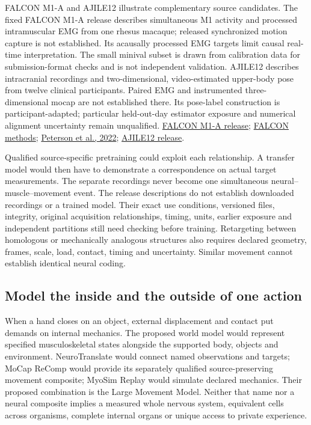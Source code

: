FALCON M1-A and AJILE12 illustrate complementary source candidates. The fixed FALCON M1-A release describes simultaneous M1 activity and processed intramuscular EMG from one rhesus macaque; released synchronized motion capture is not established. Its acausally processed EMG targets limit causal real-time interpretation. The small minival subset is drawn from calibration data for submission-format checks and is not independent validation. AJILE12 describes intracranial recordings and two-dimensional, video-estimated upper-body pose from twelve clinical participants. Paired EMG and instrumented three-dimensional mocap are not established there. Its pose-label construction is participant-adapted; particular held-out-day estimator exposure and numerical alignment uncertainty remain unqualified. \href{https://doi.org/10.48324/dandi.000941/0.241029.1405}{FALCON M1-A release}; \href{https://papers.nips.cc/paper_files/paper/2024/file/8c2e6bb15be1894b8fb4e0f9bcad1739-Paper-Datasets_and_Benchmarks_Track.pdf}{FALCON methods}; \href{https://doi.org/10.1038/s41597-022-01280-y}{Peterson et al., 2022}; \href{https://doi.org/10.48324/dandi.000055/0.220127.0436}{AJILE12 release}.

Qualified source-specific pretraining could exploit each relationship. A transfer model would then have to demonstrate a correspondence on actual target measurements. The separate recordings never become one simultaneous neural--muscle--movement event. The release descriptions do not establish downloaded recordings or a trained model. Their exact use conditions, versioned files, integrity, original acquisition relationships, timing, units, earlier exposure and independent partitions still need checking before training. Retargeting between homologous or mechanically analogous structures also requires declared geometry, frames, scale, load, contact, timing and uncertainty. Similar movement cannot establish identical neural coding.

\subsection{Model the inside and the outside of one action}

When a hand closes on an object, external displacement and contact put demands on internal mechanics. The proposed world model would represent specified musculoskeletal states alongside the supported body, objects and environment. NeuroTranslate would connect named observations and targets; MoCap ReComp would provide its separately qualified source-preserving movement composite; MyoSim Replay would simulate declared mechanics. Their proposed combination is the Large Movement Model. Neither that name nor a neural composite implies a measured whole nervous system, equivalent cells across organisms, complete internal organs or unique access to private experience.

